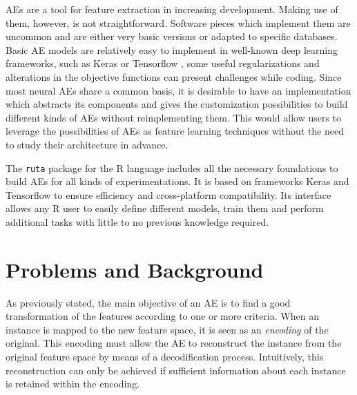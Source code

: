 AEs are a tool for feature extraction in increasing development. {Making use of them, however, is not straightforward.} Software pieces which implement them are uncommon and are either very basic versions or adapted to specific databases. {Basic AE models are relatively easy to implement in well-known deep learning frameworks, such as Keras  or Tensorflow , some useful regularizations and alterations in the objective functions can present challenges while coding.} Since most neural AEs share a common basis, it is desirable to have an implementation which abstracts its components and gives the customization possibilities to build different kinds of AEs without reimplementing them. {This would allow users to leverage the possibilities of AEs as feature learning techniques without the need to study their architecture in advance.}

The \texttt{ruta} package for the R language includes all the necessary foundations to build AEs for all kinds of experimentations. It is based on frameworks Keras and Tensorflow to ensure efficiency and cross-platform compatibility. {Its interface allows any R user to easily define different models, train them and perform additional tasks with little to no previous knowledge required.}




\section{Problems and Background}
\label{p2sec.background}


As previously stated, the main objective of an AE is to find a good transformation of the features according to one or more criteria. When an instance is mapped to the new feature space, it is seen as an \emph{encoding} of the original. This encoding must allow the AE to reconstruct the instance from the original feature space by means of a decodification process. Intuitively, this reconstruction can only be achieved if sufficient information about each instance is retained within the encoding.

